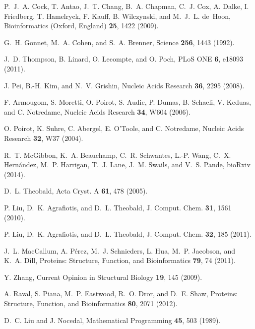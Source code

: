 \documentclass[aps,prl,preprint,nofootinbib,superscriptaddress,linenumbers]{revtex4-1}
\begin{document}
\begin{thebibliography}{100}
P.~J.~A. Cock, T. Antao, J.~T. Chang, B.~A. Chapman, C.~J. Cox, A. Dalke, I.
  Friedberg, T. Hamelryck, F. Kauff, B. Wilczynski, and M.~J.~L. de~Hoon,
  Bioinformatics (Oxford, England) {\bf 25},  1422  (2009).

G.~H. Gonnet, M.~A. Cohen, and S.~A. Brenner, Science {\bf 256},  1443  (1992).

J.~D. Thompson, B. Linard, O. Lecompte, and O. Poch, PLoS ONE {\bf 6},  e18093
  (2011).

J. Pei, B.-H. Kim, and N.~V. Grishin, Nucleic Acids Research {\bf 36},  2295
  (2008).

F. Armougom, S. Moretti, O. Poirot, S. Audic, P. Dumas, B. Schaeli, V. Keduas,
  and C. Notredame, Nucleic Acids Research {\bf 34},  W604  (2006).

O. Poirot, K. Suhre, C. Abergel, E. O'Toole, and C. Notredame, Nucleic Acids
  Research {\bf 32},  W37  (2004).

R.~T. McGibbon, K.~A. Beauchamp, C.~R. Schwantes, L.-P. Wang, C.~X.
  Hern{\'a}ndez, M.~P. Harrigan, T.~J. Lane, J.~M. Swails, and V.~S. Pande,
  bioRxiv  (2014).

D.~L. Theobald, Acta Cryst. A {\bf 61},  478  (2005).

P. Liu, D.~K. Agrafiotis, and D.~L. Theobald, J. Comput. Chem. {\bf 31},  1561
  (2010).

P. Liu, D.~K. Agrafiotis, and D.~L. Theobald, J. Comput. Chem. {\bf 32},  185
  (2011).

J.~L. MacCallum, A. P{\'e}rez, M.~J. Schnieders, L. Hua, M.~P. Jacobson, and
  K.~A. Dill, Proteins: Structure, Function, and Bioinformatics {\bf 79},  74
  (2011).

Y. Zhang, Current Opinion in Structural Biology {\bf 19},  145  (2009).

A. Raval, S. Piana, M.~P. Eastwood, R.~O. Dror, and D.~E. Shaw, Proteins:
  Structure, Function, and Bioinformatics {\bf 80},  2071  (2012).

D.~C. Liu and J. Nocedal, Mathematical Programming {\bf 45},  503  (1989).


\end{thebibliography}
\end{document}

